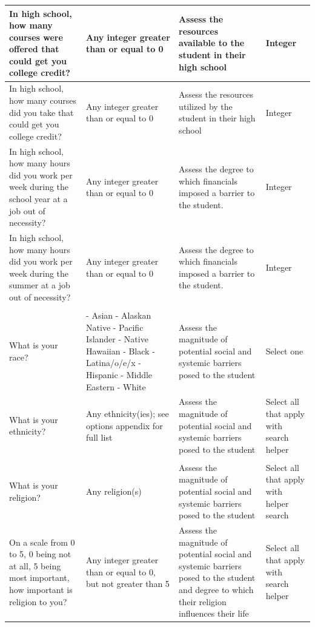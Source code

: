 \documentclass[10pt, twocolumn]{article}
\begin{document}
\begin{xltabular}{\textwidth}{|p{0.3\textwidth}|p{0.3\textwidth}|p{0.2\textwidth}|X|}
    In high school, how many courses were offered that could get you college credit? & Any integer greater than or equal to 0 & Assess the resources available to the student in their high school & Integer \\ \hline 
    In high school, how many courses did you take that could get you college credit? & Any integer greater than or equal to 0 & Assess the resources utilized by the student in their high school & Integer \\ \hline 
    In high school, how many hours did you work per week during the school year at a job out of necessity? & Any integer greater than or equal to 0 & Assess the degree to which financials imposed a barrier to the student. & Integer \\ \hline 
    In high school, how many hours did you work per week during the summer at a job out of necessity? & Any integer greater than or equal to 0 & Assess the degree to which financials imposed a barrier to the student. & Integer \\ \hline 
     \\ \hline
    What is your race? & - Asian \newline - Alaskan Native \newline - Pacific Islander \newline - Native Hawaiian \newline - Black \newline - Latina/o/e/x \newline - Hispanic \newline - Middle Eastern \newline - White & Assess the magnitude of potential social and systemic barriers posed to the student & Select one \\ \hline 
    What is your ethnicity? & Any ethnicity(ies); see options appendix for full list & Assess the magnitude of potential social and systemic barriers posed to the student & Select all that apply with search helper \\ \hline
     \\ \hline
    What is your religion? & Any religion(s) & Assess the magnitude of potential social and systemic barriers posed to the student & Select all that apply with helper search \\ \hline 
    On a scale from 0 to 5, 0 being not at all, 5 being most important, how important is religion to you? & Any integer greater than or equal to 0, but not greater than 5 & Assess the magnitude of potential social and systemic barriers posed to the student and degree to which their religion influences their life & Select all that apply with search helper \\ \hline 

\end{xltabular}
\end{document}
